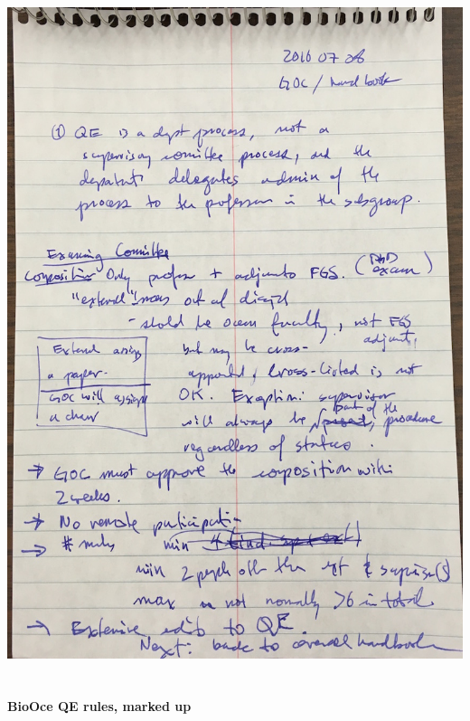 \documentclass[12pt]{article}
\begin{document}
\includegraphics[height=8in]{meetings/20160708/20160708_meeting_notes.jpg}

\newpage
\textbf{\large BioOce QE rules, marked up} \label{boqe}


\end{document}
